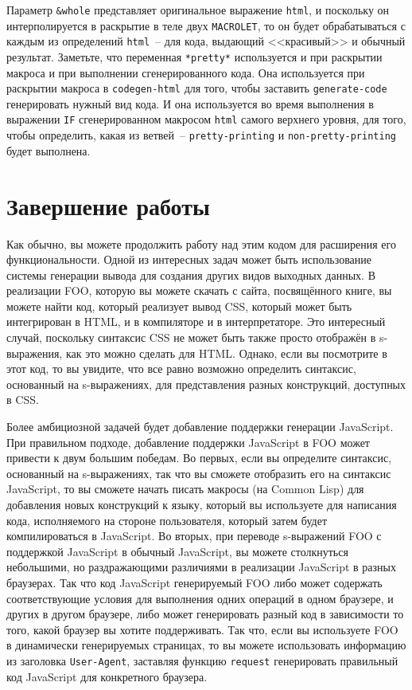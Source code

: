 Параметр \lstinline!&whole! представляет оригинальное выражение \lstinline{html}, и поскольку
он интерполируется в раскрытие в теле двух \lstinline{MACROLET}, то он будет обрабатываться с
каждым из определений \lstinline{html}~-- для кода, выдающий <<красивый>> и обычный результат.
Заметьте, что переменная \lstinline{*pretty*} используется и при раскрытии макроса и при
выполнении сгенерированного кода.  Она используется при раскрытии макроса в
\lstinline{codegen-html} для того, чтобы заставить \lstinline{generate-code} генерировать нужный вид
кода.  И она используется во время выполнения в выражении \lstinline{IF} сгенерированном
макросом \lstinline{html} самого верхнего уровня, для того, чтобы определить, какая из
ветвей~-- \lstinline{pretty-printing} и \lstinline{non-pretty-printing} будет выполнена.

\section{Завершение работы}

Как обычно, вы можете продолжить работу над этим кодом для расширения его
функциональности.  Одной из интересных задач может быть использование системы генерации
вывода для создания других видов выходных данных.  В реализации FOO, которую вы можете
скачать с сайта, посвящённого книге, вы можете найти код, который реализует вывод CSS,
который может быть интегрирован в HTML, и в компиляторе и в интерпретаторе.  Это
интересный случай, поскольку синтаксис CSS не может быть также просто отображён в
s-выражения, как это можно сделать для HTML.  Однако, если вы посмотрите в этот код, то вы
увидите, что все равно возможно определить синтаксис, основанный на s-выражениях, для
представления разных конструкций, доступных в CSS.

Более амбициозной задачей будет добавление поддержки генерации JavaScript.  При правильном
подходе, добавление поддержки JavaScript в FOO может привести к двум большим победам.  Во
первых, если вы определите синтаксис, основанный на s-выражениях, так что вы сможете
отобразить его на синтаксис JavaScript, то вы сможете начать писать макросы (на Common
Lisp) для добавления новых конструкций к языку, который вы используете для написания кода,
исполняемого на стороне пользователя, который затем будет компилироваться в JavaScript. Во
вторых, при переводе s-выражений FOO с поддержкой JavaScript в обычный JavaScript, вы
можете столкнуться небольшими, но раздражающими различиями в реализации JavaScript в
разных браузерах.  Так что код JavaScript генерируемый FOO либо может содержать
соответствующие условия для выполнения одних операций в одном браузере, и других в другом
браузере, либо может генерировать разный код в зависимости то того, какой браузер вы
хотите поддерживать.  Так что, если вы используете FOO в динамически генерируемых
страницах, то вы можете использовать информацию из заголовка \lstinline{User-Agent}, заставляя
функцию \lstinline{request} генерировать правильный код JavaScript для конкретного браузера.

